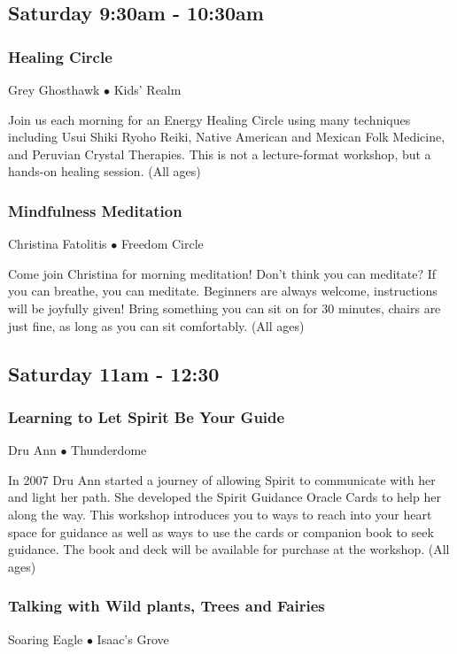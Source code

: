 

\subsection{Saturday 9:30am - 10:30am}

\subsubsection{Healing Circle}
\label{Sat-Healing3}
{\small Grey Ghosthawk $\bullet$  Kids' Realm}

 Join us each morning for an Energy Healing Circle using many techniques including Usui Shiki Ryoho Reiki, Native American and Mexican Folk Medicine, and Peruvian Crystal Therapies. This is not a lecture-format workshop, but a hands-on healing session.  {\small (All ages)}

\subsubsection{Mindfulness Meditation}
\label{Sat-Fatolitis3}
{\small Christina Fatolitis $\bullet$  Freedom Circle}

 Come join Christina for morning meditation! Don't think you can meditate? If you can breathe, you can meditate. Beginners are always welcome, instructions will be joyfully given! Bring something you can sit on for 30 minutes, chairs are just fine, as long as you can sit comfortably. {\small (All ages)}

\subsection{Saturday 11am - 12:30}

\subsubsection{Learning to Let Spirit Be Your Guide}
\label{Sat-DruAnn3}
{\small Dru Ann $\bullet$  Thunderdome}

 In 2007 Dru Ann started a journey of allowing Spirit to communicate with her and light her path. She developed the Spirit Guidance Oracle Cards to help her along the way. This workshop introduces you to ways to reach into your heart space for guidance as well as ways to use the cards or companion book to seek guidance.  The book and deck will be available for purchase at the workshop. {\small (All ages)}

\subsubsection{Talking with Wild plants, Trees and Fairies}
\label{Sat-Eagle1}
{\small Soaring Eagle $\bullet$  Isaac's Grove}

